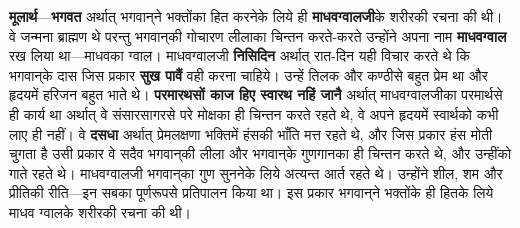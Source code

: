 \begin{sloppypar}\justifying{}
\textbf{मूलार्थ}—\textbf{भगवत} अर्थात् भगवान्‌ने भक्तोंका हित करनेके लिये ही \textbf{माधव\-ग्वालजी}के शरीरकी रचना की थी। वे जन्मना ब्राह्मण थे परन्तु भगवान्‌की गोचारण लीलाका चिन्तन करते-करते उन्होंने अपना नाम \textbf{माधव\-ग्वाल} रख लिया था—माधवका ग्वाल। माधव\-ग्वालजी \textbf{निसिदिन} अर्थात् रात-दिन यही विचार करते थे कि भगवान्‌के दास जिस प्रकार \textbf{सुख पावैं} वही करना चाहिये। उन्हें तिलक और कण्ठीसे बहुत प्रेम था और हृदयमें हरिजन बहुत भाते थे। \textbf{परमारथसों काज हिए स्वारथ नहिं जानै} अर्थात् माधव\-ग्वालजीका परमार्थसे ही कार्य था अर्थात् वे संसार\-सागरसे परे मोक्षका ही चिन्तन करते रहते थे, वे अपने हृदयमें स्वार्थको कभी लाए ही नहीं। वे \textbf{दसधा} अर्थात् प्रेम\-लक्षणा भक्तिमें हंसकी भाँति मत्त रहते थे, और जिस प्रकार हंस मोती चुगता है उसी प्रकार वे सदैव भगवान्‌की लीला और भगवान्‌के गुण\-गानका ही चिन्तन करते थे, और उन्हींको गाते रहते थे। माधव\-ग्वालजी भगवान्‌का गुण सुननेके लिये अत्यन्त आर्त रहते थे। उन्होंने शील, शम और प्रीतिकी रीति—इन सबका पूर्णरूपसे प्रतिपालन किया था। इस प्रकार भगवान्‌ने भक्तोंके ही हितके लिये माधव ग्वालके शरीरकी रचना की थी।
\end{sloppypar}


